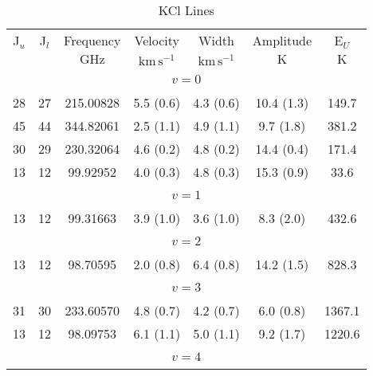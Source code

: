 \begin{table*}[htp]
\centering
\caption{KCl Lines}
\begin{tabular}{ccccccc}
\label{tab:KCl_salt_lines}
 J$_u$ & J$_l$ & Frequency & Velocity & Width & Amplitude & E$_U$ \\
  &  & $\mathrm{GHz}$ & $\mathrm{km\,s^{-1}}$ & $\mathrm{km\,s^{-1}}$ & $\mathrm{K}$ & $\mathrm{K}$ \\
\hline
&\vspace{-0.75em}\\
\multicolumn{7}{c}{$v = 0$} \\
\vspace{-0.75em}\\
 28 & 27 & 215.00828 & 5.5 (0.6) & 4.3 (0.6) & 10.4 (1.3) & 149.7 \\
 45 & 44 & 344.82061 & 2.5 (1.1) & 4.9 (1.1) & 9.7 (1.8) & 381.2 \\
 30 & 29 & 230.32064 & 4.6 (0.2) & 4.8 (0.2) & 14.4 (0.4) & 171.4 \\
 13 & 12 & 99.92952 & 4.0 (0.3) & 4.8 (0.3) & 15.3 (0.9) & 33.6 \\
&\vspace{-0.75em}\\
\multicolumn{7}{c}{$v = 1$} \\
\vspace{-0.75em}\\
 13 & 12 & 99.31663 & 3.9 (1.0) & 3.6 (1.0) & 8.3 (2.0) & 432.6 \\
&\vspace{-0.75em}\\
\multicolumn{7}{c}{$v = 2$} \\
\vspace{-0.75em}\\
 13 & 12 & 98.70595 & 2.0 (0.8) & 6.4 (0.8) & 14.2 (1.5) & 828.3 \\
&\vspace{-0.75em}\\
\multicolumn{7}{c}{$v = 3$} \\
\vspace{-0.75em}\\
 31 & 30 & 233.60570 & 4.8 (0.7) & 4.2 (0.7) & 6.0 (0.8) & 1367.1 \\
 13 & 12 & 98.09753 & 6.1 (1.1) & 5.0 (1.1) & 9.2 (1.7) & 1220.6 \\
&\vspace{-0.75em}\\
\multicolumn{7}{c}{$v = 4$} \\
\vspace{-0.75em}\\

\end{tabular}
\end{table*}
